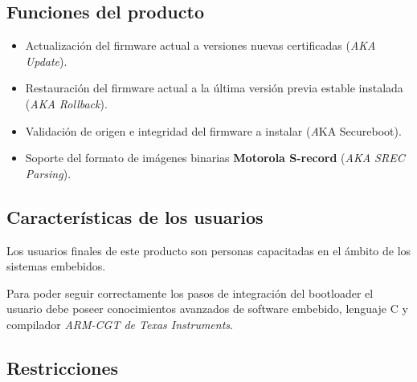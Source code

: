 \documentclass[12pt,a4paper]{article}
\begin{document}
\subsection{Funciones del producto}
\label{sec:product_functions}

\begin{itemize}
	\item Actualización del firmware actual a versiones nuevas certificadas (\textit{AKA Update}).
	
	\item Restauración del firmware actual a la última versión previa estable instalada (\textit{AKA Rollback}).
	
	\item Validación de origen e integridad del firmware a instalar (\textit AKA Secureboot).
	
	\item Soporte del formato de imágenes binarias \textbf{Motorola S-record} (\textit{AKA SREC Parsing}).
\end{itemize}


\subsection{Características de los usuarios}
\label{sec:user_characteristics}

Los usuarios finales de este producto son personas capacitadas en el ámbito de los sistemas embebidos.

Para poder seguir correctamente los pasos de integración del bootloader el usuario debe poseer conocimientos avanzados de software embebido, lenguaje C y compilador \textit{ARM-CGT de Texas Instruments}.


\subsection{Restricciones}
\label{sec:constraints}
\end{document}
